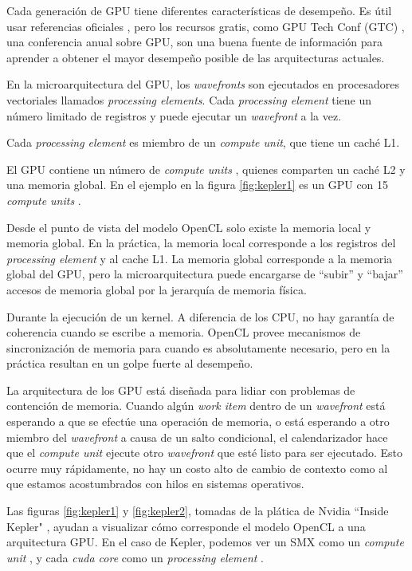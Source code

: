 Cada generación de GPU tiene diferentes características de desempeño. Es útil
usar referencias oficiales \cite{maxwell-tuning}, pero los recursos gratis,
como GPU Tech Conf (GTC) \cite{gtc}, una conferencia anual sobre GPU, son una
buena fuente de información para aprender a obtener el mayor desempeño posible
de las arquitecturas actuales.

En la microarquitectura del GPU, los \emph{wavefronts} son ejecutados en
procesadores vectoriales llamados \emph{processing elements}. Cada \emph{ processing
element } tiene un número limitado de registros y puede ejecutar un \emph{wavefront} a la vez.

Cada \emph{ processing element } es miembro de un \emph{compute unit}, que tiene un caché L1.

El GPU contiene un número de \emph{ compute units }, quienes comparten un caché L2 y una
memoria global. En el ejemplo en la figura \ref{fig:kepler1} es un GPU con 15
\emph{ compute units }.

Desde el punto de vista del modelo OpenCL solo existe la memoria local y
memoria global. En la práctica, la memoria local corresponde a los registros
del \emph{ processing element } y al cache L1. La memoria global corresponde a la
memoria global del GPU, pero la microarquitectura puede encargarse de ``subir''
y ``bajar''  accesos de memoria global por la jerarquía de memoria física.

Durante la ejecución de un kernel. A diferencia de los CPU, no hay garantía de
coherencia cuando se escribe a memoria. OpenCL provee mecanismos de
sincronización de memoria para cuando es absolutamente necesario, pero en la
práctica resultan en un golpe fuerte al desempeño.

La arquitectura de los GPU está diseñada para lidiar con problemas de
contención de memoria. Cuando algún \emph{work item} dentro de un \emph{wavefront} está
esperando a que se efectúe una operación de memoria, o está esperando a otro
miembro del \emph{wavefront} a causa de un salto condicional, el calendarizador hace
que el \emph{compute unit} ejecute otro \emph{wavefront} que esté listo para ser
ejecutado. Esto ocurre muy rápidamente, no hay un costo alto de cambio de
contexto como al que estamos acostumbrados con hilos en sistemas operativos.

Las figuras \ref{fig:kepler1} y \ref{fig:kepler2}, tomadas de la plática de
Nvidia ``Inside Kepler" \cite{kepler-slides}, ayudan a visualizar cómo
corresponde el modelo OpenCL a una arquitectura GPU. En el caso de Kepler,
podemos ver un SMX como un \emph{ compute unit }, y cada \emph{ cuda core } como un \emph{ processing element }.

